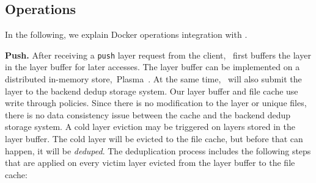 \subsection{Operations}
\label{sec:design_operations}

%
In the following, we explain Docker operations integration with \sysname.


\textbf{Push.}
After receiving a \texttt{push} layer request from the client, 
\sysname~first buffers the layer in the layer buffer for later accesses.
The layer buffer can be implemented on a distributed in-memory store,~\eg Plasma~\cite{plasma}.
At the same time, \sysname~will also submit the layer to the backend dedup storage system.
Our layer buffer and file cache use write through policies. 
Since there is no modification to the layer or unique files, 
there is no data consistency issue between the cache and the backend dedup storage system.
A cold layer eviction may be triggered on layers stored in the layer buffer.
The cold layer will be evicted to the file cache, but before that can happen, it will be \emph{deduped}.
The deduplication process includes the following steps 
that are applied on every victim layer evicted from the layer buffer to the file cache:

